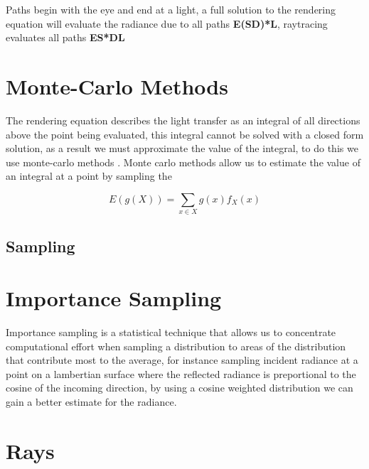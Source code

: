 Paths begin with the eye and end at a light, a full solution to the rendering equation will evaluate the radiance due
to all paths \textbf{E(S\textbar D)*L}, raytracing evaluates all paths \textbf{ES*DL}

\section{Monte-Carlo Methods}
The rendering equation describes the light transfer as an integral of all directions above the point being evaluated, this
integral cannot be solved with a closed form solution, as a result we must approximate the value of the integral, to do this
we use monte-carlo methods \cite{wood-monte-carlo}. Monte carlo methods allow us to estimate the value of an integral at a point
by sampling the 

\begin{equation}
E\left(g\left(X\right)\right) = \sum\limits_{x \in X} g\left(x\right)f_X\left(x\right)
\end{equation}


\subsection{Sampling}
\section{Importance Sampling}
Importance sampling is a statistical technique that allows us to concentrate computational effort when sampling a distribution
to areas of the distribution that contribute most to the average, for instance sampling incident radiance at a point on a lambertian
surface where the reflected radiance is preportional to the cosine of the incoming direction, by using a cosine weighted distribution
we can gain a better estimate for the radiance.

\section{Rays}

